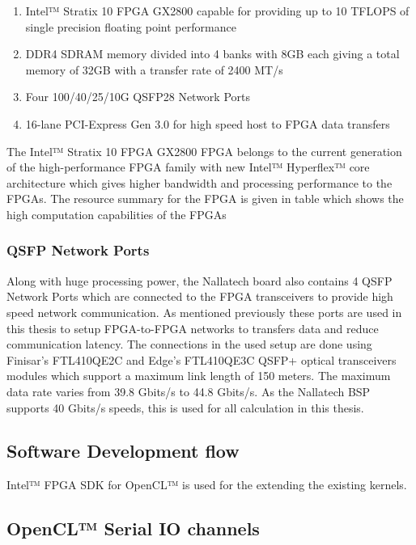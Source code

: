 \begin{enumerate}
    \item Intel™ Stratix 10 FPGA GX2800 capable for providing up to 10 TFLOPS of single
    precision floating point performance
    \item DDR4 SDRAM memory divided into 4 banks with 8GB each giving a total memory of 32GB with
    a transfer rate of 2400 MT/s
    \item Four 100/40/25/10G QSFP28 Network Ports
    \item 16-lane PCI-Express Gen 3.0 for high speed host to FPGA data transfers
\end{enumerate}

The Intel™ Stratix 10 FPGA GX2800 FPGA belongs to the current generation of the high-performance FPGA
family with new Intel™ Hyperflex™ core architecture which gives higher bandwidth and processing
performance to the FPGAs. The resource summary for the FPGA is given in table 
which shows the high computation capabilities of the FPGAs

\subsubsection*{QSFP Network Ports}

Along with huge processing power, the Nallatech board also contains 4 QSFP Network Ports which
are connected to the FPGA transceivers to provide high speed network communication. As mentioned
previously these ports are used in this thesis to setup FPGA-to-FPGA networks to transfers data
and reduce communication latency. The connections in the used setup are done using
Finisar's FTL410QE2C and Edge's FTL410QE3C QSFP+ optical transceivers modules which support a
maximum link length of 150 meters. The maximum data rate varies from 39.8 Gbits/s to 44.8 Gbits/s.
As the Nallatech BSP supports 40 Gbits/s speeds, this is used for all calculation in this thesis.


\subsection{Software Development flow}

Intel™ FPGA SDK for OpenCL™ is used for the extending the existing kernels.

\subsection{OpenCL™ Serial IO channels}

